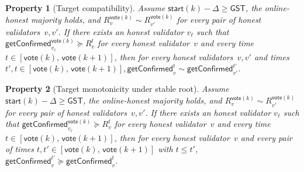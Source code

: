 \ifx\litemode\undefined\documentclass{article}\fi
\newcommand{\start}{\mathsf{start}}
\newcommand{\vote}{\mathsf{vote}}
\newcommand{\getConfirmed}{\textsf{getConfirmed}\xspace}
\theoremstyle{plain}
\newtheorem{property}{Property}
\theoremstyle{definition}
\theoremstyle{remark}
\newcommand{\GST}{\ensuremath{\mathsf{GST}}}
\newcommand{\OHM}{online-honest majority\xspace}
\begin{document}
\begin{property}[Target compatibility]\label{rev:prop:getConfirmed-compat}
Assume $\start(k) - \Delta \geq \GST$, the \OHM holds, and $R_v^{\vote(k)} \sim R_{v'}^{\vote(k)}$ for every pair of honest validators~$v, v'$.
If there exists an honest validator $v_\ell$ such that $\getConfirmed_{v_\ell}^{\vote(k)} \succeq R_{v}^t$ for every honest validator~$v$ and every time $t \in [\vote(k),\, \vote(k+1)]$, then for every honest validators~$v,v'$ and times $t',t \in [\vote(k),\, \vote(k+1)], \getConfirmed_v^{t} \sim \getConfirmed_{v'}^{t'}$.
\end{property}

\begin{property}[Target monotonicity under stable root]\label{rev:prop:target-monotonicity}
Assume $\start(k) - \Delta \geq \GST$, the \OHM holds, and $R_v^{\vote(k)} \sim R_{v'}^{\vote(k)}$ for every pair of honest validators~$v, v'$.
If there exists an honest validator $v_\ell$ such that $\getConfirmed_{v_\ell}^{\vote(k)} \succeq R_{v}^t$ for every honest validator~$v$ and every time $t \in [\vote(k),\, \vote(k+1)]$, then for every honest validator~$v$ and every pair of times $t, t' \in [\vote(k),\, \vote(k+1)]$ with $t \leq t'$, $\getConfirmed_v^{t'} \succeq \getConfirmed_v^t$.
\end{property}
\end{document}
